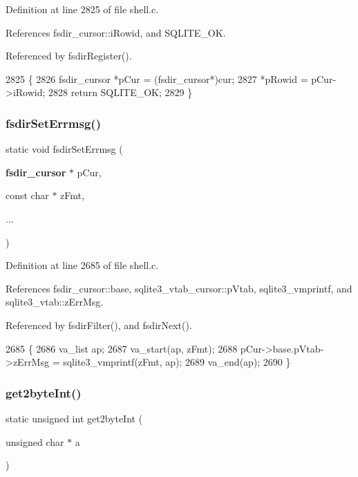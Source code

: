 Definition at line 2825 of file shell.\+c.



References fsdir\+\_\+cursor\+::i\+Rowid, and S\+Q\+L\+I\+T\+E\+\_\+\+OK.



Referenced by fsdir\+Register().


\begin{DoxyCode}
2825                                                                      \{
2826   fsdir_cursor *pCur = (fsdir_cursor*)cur;
2827   *pRowid = pCur->iRowid;
2828   \textcolor{keywordflow}{return} SQLITE_OK;
2829 \}
\end{DoxyCode}
\mbox{\label{shell_8c_a090b7c0b5d15e3453bb09dc16ade6cf5}} 
\subsubsection{fsdir\+Set\+Errmsg()}
{\footnotesize\ttfamily static void fsdir\+Set\+Errmsg (\begin{DoxyParamCaption}\item[{\textbf{ fsdir\+\_\+cursor} $\ast$}]{p\+Cur,  }\item[{const char $\ast$}]{z\+Fmt,  }\item[{}]{... }\end{DoxyParamCaption})\hspace{0.3cm}{\ttfamily [static]}}



Definition at line 2685 of file shell.\+c.



References fsdir\+\_\+cursor\+::base, sqlite3\+\_\+vtab\+\_\+cursor\+::p\+Vtab, sqlite3\+\_\+vmprintf, and sqlite3\+\_\+vtab\+::z\+Err\+Msg.



Referenced by fsdir\+Filter(), and fsdir\+Next().


\begin{DoxyCode}
2685                                                                      \{
2686   va\_list ap;
2687   va\_start(ap, zFmt);
2688   pCur->base.pVtab->zErrMsg = sqlite3_vmprintf(zFmt, ap);
2689   va\_end(ap);
2690 \}
\end{DoxyCode}
\mbox{\label{shell_8c_a0f5257621423023ca68abd46df29a547}} 
\subsubsection{get2byte\+Int()}
{\footnotesize\ttfamily static unsigned int get2byte\+Int (\begin{DoxyParamCaption}\item[{unsigned char $\ast$}]{a }\end{DoxyParamCaption})\hspace{0.3cm}{\ttfamily [static]}}



